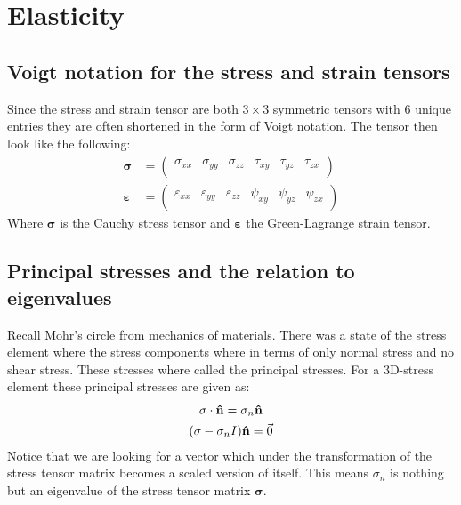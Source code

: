 \documentclass[11pt, a4paper]{article}
\renewcommand*{\epsilon}{\varepsilon}
\DeclareRobustCommand{\uvec}[1]{{%
  \ifcat\relax\noexpand#1%
    \bm{\hat{#1}}%
  \else
    \ifcsname uvec#1\endcsname
      \csname uvec#1\endcsname
    \else
      \bm{\hat{\mathbf{#1}}}%
     \fi
   \fi
}}
\numberwithin{equation}{section}
\numberwithin{figure}{section}
\begin{document}
\setcounter{section}{3}

\section{Elasticity}
\subsection{Voigt notation for the stress and strain tensors}
Since the stress and strain tensor are both $3\times 3$ symmetric tensors with 6 unique entries they are often shortened in the form of Voigt notation. The tensor then look like the following:
\begin{align}
  \mathbf{\sigma} &=
  \begin{pmatrix}
    \sigma_{xx} & \sigma_{yy} & \sigma_{zz} & \tau_{xy} & \tau_{yz} & \tau_{zx}\\
  \end{pmatrix}\\
  \mathbf{\epsilon} &= 
  \begin{pmatrix}
    \epsilon_{xx} & \epsilon_{yy} & \epsilon_{zz} & \psi_{xy} & \psi_{yz} & \psi_{zx}\\
  \end{pmatrix}
\end{align}
Where $\mathbf{\sigma}$ is the Cauchy stress tensor and $\mathbf{\epsilon}$ the Green-Lagrange strain tensor.


\subsection{Principal stresses and the relation to eigenvalues}
Recall Mohr's circle from mechanics of materials. There was a state of the stress element where the stress components where in terms of only normal stress and no shear stress. These stresses where called the principal stresses. For a 3D-stress element these principal stresses are given as:
\begin{gather}
  \mathbf{\sigma} \cdot \uvec{n} = \sigma_n \uvec{n}\\
  (\mathbf{\sigma} - \sigma_n I)\uvec{n} = \vec{0}
\end{gather}
Notice that we are looking for a vector which under the transformation of the stress tensor matrix becomes a scaled version of itself. This means $\sigma_n$ is nothing but an eigenvalue of the stress tensor matrix $\mathbf{\sigma}$.
\end{document}
